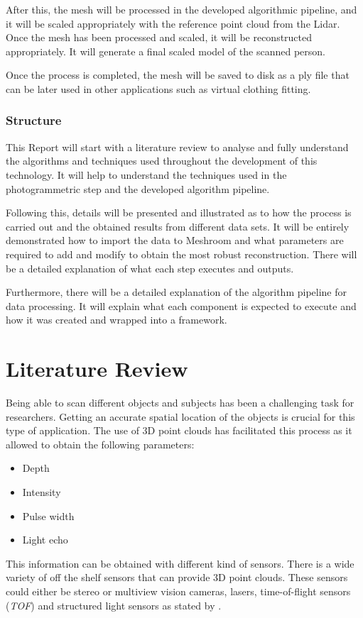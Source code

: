 \documentclass[12pt]{report}
\begin{document}
After this, the mesh will be processed in the developed algorithmic pipeline, and it will be scaled appropriately with the reference point cloud from the Lidar. 
Once the mesh has been processed and scaled, it will be reconstructed appropriately. It will generate a final scaled model of the scanned person.

Once the process is completed, the mesh will be saved to disk as a ply file that can be later used in other applications such as virtual clothing fitting. 


\subsection{Structure}
This Report will start with a literature review to analyse and fully understand the algorithms and techniques used throughout the development of this technology. 
It will help to understand the techniques used in the photogrammetric step and the developed algorithm pipeline.

Following this, details will be presented and illustrated as to how the process is carried out and the obtained results from different data sets.
It will be entirely demonstrated how to import the data to Meshroom and what parameters are required to add and modify to obtain the most robust reconstruction. There will be a detailed explanation of what each step executes and outputs.

Furthermore, there will be a detailed explanation of the algorithm pipeline for data processing. It will explain what each component is expected to execute and how it was created and wrapped into a framework.

\enlargethispage{\baselineskip}



\chapter{Literature Review}
Being able to scan different objects and subjects has been a challenging task for researchers. Getting an accurate spatial location of the objects is crucial for this type of application.
The use of 3D point clouds has facilitated this process as it allowed to obtain the following parameters:
\begin{itemize}[]
  \itemsep0em 
  \item Depth
  \item Intensity
  \item Pulse width
  \item Light echo
\end{itemize}
This information can be obtained with different kind of sensors. There is a wide variety of off the shelf sensors that can provide 3D point clouds. 
These sensors could either be stereo or multiview vision cameras, lasers, time-of-flight sensors (\textit{TOF}) and structured light sensors as stated by .
\end{document}

